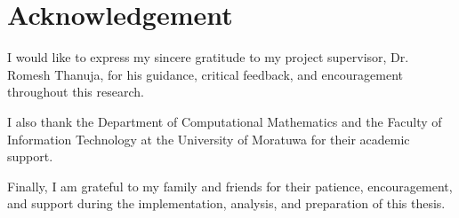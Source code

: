 \section*{Acknowledgement}


I would like to express my sincere gratitude to my project supervisor, Dr. Romesh Thanuja, for his guidance, critical feedback, and encouragement throughout this research.


I also thank the Department of Computational Mathematics and the Faculty of Information Technology at the University of Moratuwa for their academic support.


Finally, I am grateful to my family and friends for their patience, encouragement, and support during the implementation, analysis, and preparation of this thesis.

